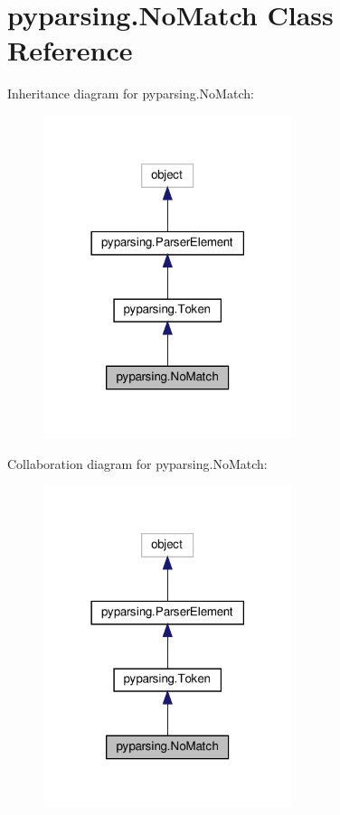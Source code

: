 \hypertarget{classpyparsing_1_1NoMatch}{}\section{pyparsing.\+No\+Match Class Reference}
\label{classpyparsing_1_1NoMatch}


Inheritance diagram for pyparsing.\+No\+Match\+:
\nopagebreak
\begin{figure}[H]
\begin{center}
\leavevmode
\includegraphics[width=206pt]{classpyparsing_1_1NoMatch__inherit__graph}
\end{center}
\end{figure}


Collaboration diagram for pyparsing.\+No\+Match\+:
\nopagebreak
\begin{figure}[H]
\begin{center}
\leavevmode
\includegraphics[width=206pt]{classpyparsing_1_1NoMatch__coll__graph}
\end{center}
\end{figure}
